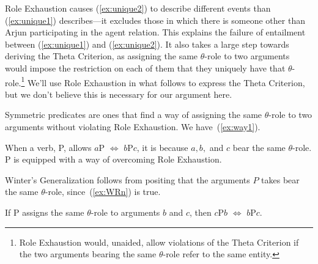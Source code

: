 \documentclass[twoside, 12pt]{article}
\begin{document}
Role Exhaustion causes (\ref{ex:unique2}) to describe different events than (\ref{ex:unique1}) describes---it excludes those in which there is someone other than Arjun participating in the agent relation. This explains the failure of entailment between (\ref{ex:unique1}) and (\ref{ex:unique2}). It also takes a large step towards deriving the Theta Criterion, as  assigning the same $\theta$-role to two arguments would impose the restriction on each of them that they uniquely have that $\theta$-role.\footnote{Role Exhaustion would, unaided, allow violations of the Theta Criterion if the two arguments bearing the same $\theta$-role refer to the same entity.} We'll use Role Exhaustion in what follows to express the Theta Criterion, but we don't believe this is necessary for our argument here.

Symmetric predicates are ones that find a way of assigning the same $\theta$-role to two arguments without violating Role Exhaustion. We have~(\ref{ex:way1}).
\begin{exe}
\raggedright
  \ex \label{ex:way1} When a verb, P, allows $a$P $\Leftrightarrow$ $b$P$c$, it is because $a, b,$ and $c$ bear the same $\theta$-role. P is equipped with a way of overcoming Role Exhaustion.
\end{exe}
Winter's Generalization follows from positing that the arguments $P$ takes bear the same $\theta$-role, since~(\ref{ex:WRn}) is true.
\begin{exe}
\raggedright
  \ex \label{ex:WRn} If P assigns the same $\theta$-role to arguments $b$ and $c$, then $c$P$b$ $\Leftrightarrow$ $b$P$c$.
\end{exe}
\end{document}
